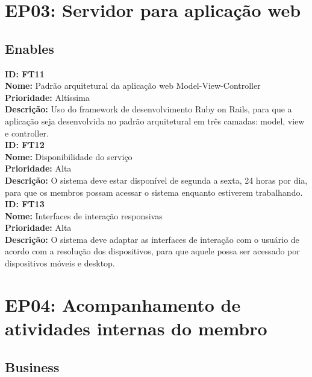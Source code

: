 \begin{anexosenv}
\section[EP03: Servidor para aplicação web]{EP03: Servidor para aplicação web}

\subsection[Enables]{Enables}

\indent \textbf{ID: FT11}\\
\indent \textbf{Nome: }Padrão arquitetural da aplicação web Model-View-Controller\\
\indent \textbf{Prioridade:} Altíssima\\
\indent \textbf{Descrição:} Uso do framework de desenvolvimento Ruby on Rails, para que a aplicação seja desenvolvida no padrão arquitetural em três camadas: model, view e controller.\\

\indent \textbf{ID: FT12}\\
\indent \textbf{Nome:} Disponibilidade do serviço\\
\indent \textbf{Prioridade:} Alta\\
\indent \textbf{Descrição:} O sistema deve estar disponível de segunda a sexta, 24 horas por dia, para que os membros possam acessar o sistema enquanto estiverem trabalhando.\\


\indent \textbf{ID: FT13}\\
\indent \textbf{Nome:} Interfaces de interação responsivas\\
\indent \textbf{Prioridade:} Alta\\
\indent \textbf{Descrição:} O sistema deve adaptar as interfaces de interação com o usuário de acordo com a resolução dos dispositivos, para que aquele possa ser acessado por dispositivos móveis e desktop.\\

\section[EP04: Acompanhamento de atividades internas do membro]{EP04: Acompanhamento de atividades internas do membro}

\subsection[Business]{Business}


\end{anexosenv}
